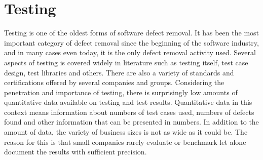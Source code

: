 
 \section{Testing}
\label{sec:testing}

Testing is one of the oldest forms of software defect removal. It has been the most important category of defect removal since the beginning of the software industry, and in many cases even today, it is the only defect removal activity used. Several aspects of testing is covered widely in literature such as testing itself, test case design, test libraries and others. There are also a variety of standards and certifications offered by several companies and groups. Considering the penetration and importance of testing, there is surprisingly low amounts of quantitative data available on testing and test results. Quantitative data in this context means information about numbers of test cases used, numbers of defects found and other information that can be presented in numbers. In addition to the amount of data, the variety of business sizes is not as wide as it could be. The reason for this is that small companies rarely evaluate or benchmark let alone document the results with sufficient precision.




% 





% 
% 
% 




